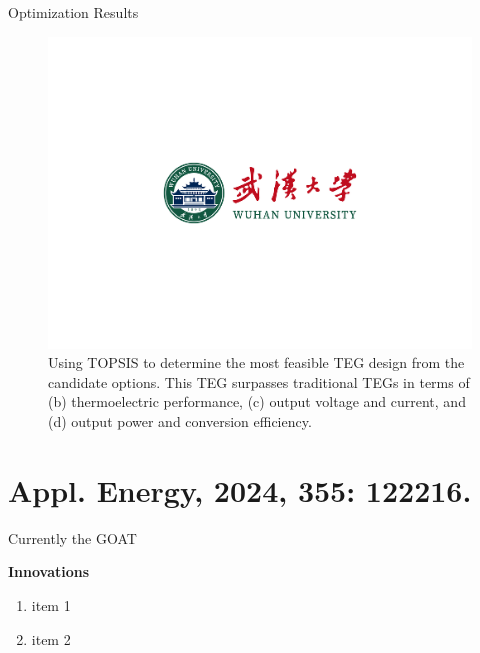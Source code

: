 \documentclass{beamer}
\begin{document}
\begin{frame}{Optimization Results}
    \small
    \begin{figure}
		\centering
		\includegraphics[scale=0.26]{pic/dark.pdf}
		\caption{Using TOPSIS to determine the most feasible TEG design from the candidate options. This TEG surpasses traditional TEGs in terms of (b) thermoelectric performance, (c) output voltage and current, and (d) output power and conversion efficiency.}
		\label{fig8}
	\end{figure}
\end{frame}


\section{Appl. Energy, 2024, 355: 122216.}

\begin{frame}{Currently the GOAT}
    \small
    \begin{block}{\textbf{Innovations}}
        \begin{enumerate}
            \item item 1
            \item item 2
        \end{enumerate}   
    \end{block}
\end{frame}
\end{document}
